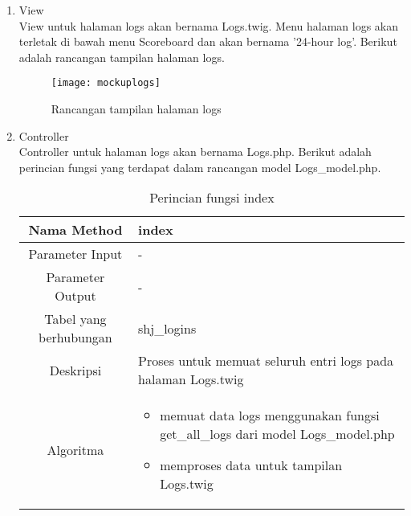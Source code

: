 \begin{enumerate}
	\item View \\
	View untuk halaman logs akan bernama Logs.twig. Menu halaman logs akan terletak di bawah menu Scoreboard dan akan bernama '24-hour log'. Berikut adalah rancangan tampilan halaman logs.
	
	\begin{figure}[H]
		\centering  
		\texttt{[image: mockuplogs]}  
		\caption[Rancangan tampilan halaman logs]{Rancangan tampilan halaman logs} 
		\label{fig:mockuplogs} 
	\end{figure}

	\item Controller \\
	Controller untuk halaman logs akan bernama Logs.php. Berikut adalah perincian fungsi yang terdapat dalam rancangan model Logs\_model.php.
	\begin{table}[H]
		\caption{Perincian fungsi index}
		\begin{tabular}{|c|p{11cm}|}
			\hline
			Nama Method 	& 	index 	\\
			\hline
			Parameter Input & - \\
			\hline
			Parameter Output &  - \\
			\hline
			Tabel yang berhubungan & shj\_logins \\
			\hline
			Deskripsi	& Proses untuk memuat seluruh entri logs pada halaman Logs.twig	 \\
			\hline
			Algoritma	& \begin{itemize}
				\item memuat data logs menggunakan fungsi get\_all\_logs dari model Logs\_model.php
				\item memproses data untuk tampilan Logs.twig
			\end{itemize} \\
			\hline
		\end{tabular}
	\end{table}
\end{enumerate}
